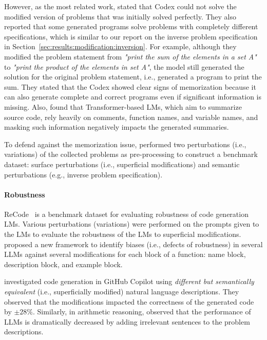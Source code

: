 \documentclass{article}
\begin{document}
However, as the most related work, \citet{karmakar2022hackerrank} stated that Codex could not solve the modified version of problems that was initially solved perfectly.
They also reported that some generated programs solve problems with completely different specifications, which is similar to our report on the inverse problem specification in Section~\ref{sec:results:modification:inversion}.
For example, although they modified the problem statement from \textit{"print the sum of the elements in a set A"} to \textit{"print the product of the elements in set A"}, the model still generated the solution for the original problem statement, i.e., generated a program to print the sum.
They stated that the Codex showed clear signs of memorization because it can also generate complete and correct programs even if significant information is missing.
Also, \citet{sontakke2022code} found that Transformer-based LMs, which aim to summarize source code, rely heavily on comments, function names, and variable names, and masking such information negatively impacts the generated summaries.

To defend against the memorization issue, \citet{lai2022ds1000} performed two perturbations (i.e., variations) of the collected problems as pre-processing to construct a benchmark dataset: surface perturbations (i.e., superficial modifications) and semantic perturbations (e.g., inverse problem specification).



\paragraph{Robustness}

ReCode~\citep{wang2022recode} is a benchmark dataset for evaluating robustness of code generation LMs.
Various perturbations (variations) were performed on the prompts given to the LMs to evaluate the robustness of the LMs to superficial modifications.
\citet{mouselinos2022bias} proposed a new framework to identify biases (i.e., defects of robustness) in several LLMs against several modifications for each block of a function: name block, description block, and example block.

\citet{mastropaolo2023robustness} investigated code generation in GitHub Copilot using \textit{different but semantically equivalent} (i.e., superficially modified) natural language descriptions.
They observed that the modifications impacted the correctness of the generated code by $\pm 28\%$.
Similarly, in arithmetic reasoning, \citet{shi2023distract} observed that the performance of LLMs is dramatically decreased by adding irrelevant sentences to the problem descriptions.
\end{document}
